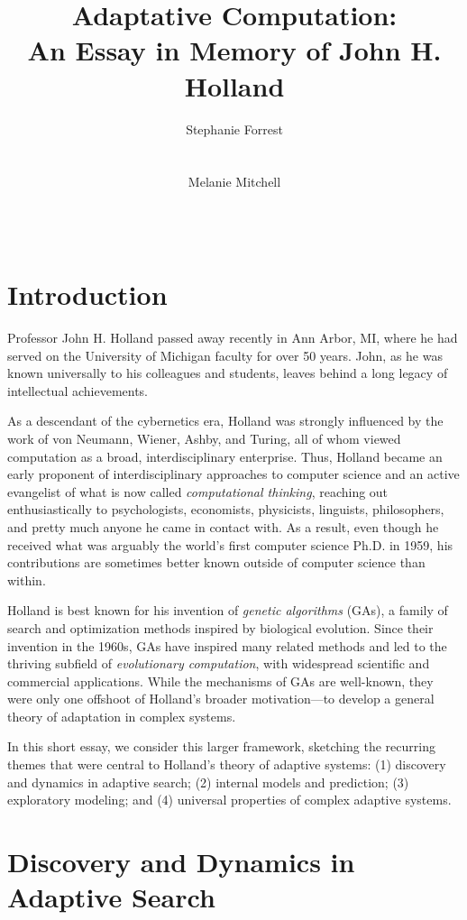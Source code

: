 \documentclass{sig-alternate}
\title{Adaptative Computation:\\ An Essay in Memory of John H. Holland}
\author 
{\alignauthor
 Stephanie Forrest\\
 \affaddr{University of New Mexico}\\
 \affaddr{Santa Fe Institute}\\
 \email{forrest@cs.unm.edu}
 \alignauthor
Melanie Mitchell \\
 \affaddr{Portland State University}\\
 \affaddr{Santa Fe Institute}\\
 \email{mm@pdx.edu}
}
\begin{document}
\maketitle

% 

\section{Introduction}

Professor John H. Holland passed away recently in Ann Arbor, MI, where
he had served on the University of Michigan faculty for over 50 years.
John, as he was known universally to his colleagues and students,
leaves behind a long legacy of intellectual achievements.

As a descendant of the cybernetics era, Holland was strongly
influenced by the work of von Neumann, Wiener, Ashby, and Turing, all
of whom viewed computation as a broad, interdisciplinary enterprise.
Thus, Holland became an early proponent of interdisciplinary
approaches to computer science and an active evangelist of what is now
called \emph{computational thinking}, reaching out enthusiastically to
psychologists, economists, physicists, linguists, philosophers, and
pretty much anyone he came in contact with.  As a result, even though
he received what was arguably the world's first computer science
Ph.D. in 1959, his contributions are sometimes better known outside of
computer science than within.

Holland is best known for his invention of \emph{genetic
  algorithms} (GAs), a family of search and optimization methods inspired
by biological evolution.  Since their invention in the 1960s, GAs have
inspired many related methods and led to the thriving subfield of
\emph{evolutionary computation}, with widespread scientific and
commercial applications.  While the mechanisms of GAs are well-known,
they were only one
offshoot of Holland's broader motivation---to develop a general
theory of adaptation in complex systems.  

In this short essay, we consider this larger framework, sketching the
recurring themes that were central to Holland's theory of
adaptive systems: (1) discovery and 
dynamics in adaptive search; (2) internal models and prediction; (3) 
exploratory modeling; and (4) universal properties of complex adaptive systems.  

\section{Discovery and Dynamics in Adaptive Search} 
\end{document}

